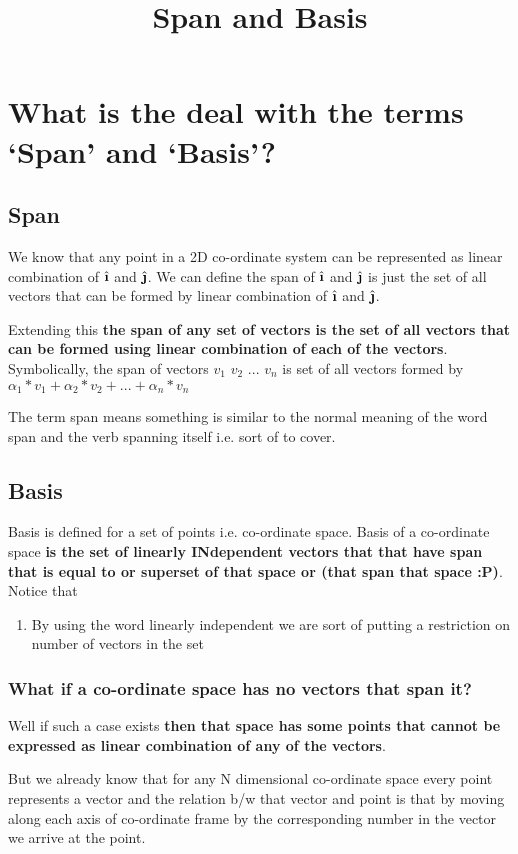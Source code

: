 \documentclass[12pt]{article}
\title{Span and Basis}
\author{}
\date{}
\newcommand{\ihat}{\hat{\textbf{\i}}}
\newcommand{\jhat}{\hat{\textbf{\j}}}
\begin{document}
\maketitle

\section{What is the deal with the terms `Span' and `Basis'?}
\subsection{Span}
We know that any point in a 2D co-ordinate system can be represented as linear combination of $ \ihat $ and $ \jhat $.
We can define the span of $ \ihat $ and $ \jhat $ is just the set of all vectors that can be formed by linear combination of $ \ihat $ and $ \jhat $.

Extending this \textbf{the span of any set of vectors is the set of all vectors that can be formed using linear combination of each of the vectors}. Symbolically, the span of vectors $ v_1 $ $ v_2 $ ... $ v_n $ is set of all vectors formed by $ \alpha_1 * v_1 + \alpha_2 * v_2 + ... + \alpha_n * v_n $

The term span means something is similar to the normal meaning of the word span and the verb spanning itself i.e. sort of to cover.

\subsection{Basis}
Basis is defined for a set of points i.e. co-ordinate space. Basis of a co-ordinate space \textbf{is the set of linearly INdependent vectors that that have span that is equal to or superset of that space or (that span that space :P)}. Notice that
\begin{enumerate}
  \item By using the word linearly independent we are sort of putting a restriction on number of vectors in the set
\end{enumerate}

\subsubsection{What if a co-ordinate space has no vectors that span it?}
Well if such a case exists \textbf{then that space has some points that cannot be expressed as linear combination of any of the vectors}.

But we already know that for any N dimensional co-ordinate space every point represents a vector and the relation b/w that vector and point is that by moving along each axis of co-ordinate frame by the corresponding number in the vector we arrive at the point.
\end{document}
